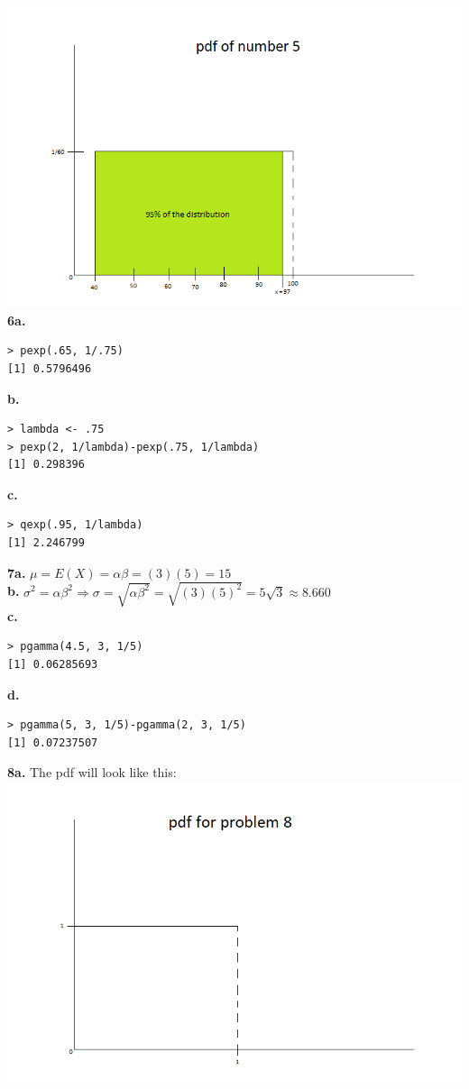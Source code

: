\documentclass[12pt]{report}
\begin{document}
\includegraphics[scale = 0.7]{hw3_5d}\\

\noindent \textbf{6a.} 
\begin{verbatim}
> pexp(.65, 1/.75)
[1] 0.5796496
\end{verbatim}

\noindent \textbf{b.}
\begin{verbatim}
> lambda <- .75
> pexp(2, 1/lambda)-pexp(.75, 1/lambda)
[1] 0.298396
\end{verbatim}

\pagebreak
\noindent \textbf{c.} 
\begin{verbatim}
> qexp(.95, 1/lambda)
[1] 2.246799
\end{verbatim}

\noindent \textbf{7a.} $\mu = E(X) = \alpha\beta = (3)(5) = \boxed{15}$\\
\noindent \textbf{b.} $\sigma^2 = \alpha\beta^2 \Rightarrow \sigma = \sqrt{\alpha\beta^2} = \sqrt{(3)(5)^2} = 5\sqrt{3} \approx \boxed{8.660}$\\
\noindent \textbf{c.} 
\begin{verbatim}
> pgamma(4.5, 3, 1/5)
[1] 0.06285693
\end{verbatim}

\noindent \textbf{d.}
\begin{verbatim}
> pgamma(5, 3, 1/5)-pgamma(2, 3, 1/5)
[1] 0.07237507
\end{verbatim}

\noindent \textbf{8a.} The pdf will look like this:\\ 
\includegraphics[scale = .7]{hw3_8}
\end{document}
